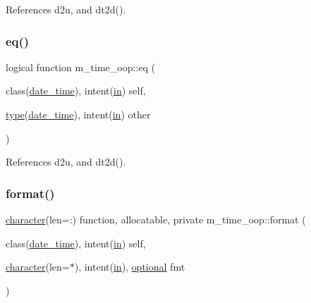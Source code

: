 References d2u, and dt2d().

\mbox{\label{namespacem__time__oop_afcc34853af3eda020eb5ff802e04964d}} 
\subsubsection{\texorpdfstring{eq()}{eq()}}
{\footnotesize\ttfamily logical function m\+\_\+time\+\_\+oop\+::eq (\begin{DoxyParamCaption}\item[{class(\hyperlink{structm__time__oop_1_1date__time}{date\+\_\+time}), intent(\hyperlink{M__journal_83_8txt_afce72651d1eed785a2132bee863b2f38}{in})}]{self,  }\item[{\hyperlink{stop__watch_83_8txt_a70f0ead91c32e25323c03265aa302c1c}{type}(\hyperlink{structm__time__oop_1_1date__time}{date\+\_\+time}), intent(\hyperlink{M__journal_83_8txt_afce72651d1eed785a2132bee863b2f38}{in})}]{other }\end{DoxyParamCaption})\hspace{0.3cm}{\ttfamily [private]}}



References d2u, and dt2d().

\mbox{\label{namespacem__time__oop_a78bb598e3481faa48df9733a3f9ae060}} 
\subsubsection{\texorpdfstring{format()}{format()}}
{\footnotesize\ttfamily \hyperlink{option__stopwatch_83_8txt_abd4b21fbbd175834027b5224bfe97e66}{character}(len=\+:) function, allocatable, private m\+\_\+time\+\_\+oop\+::format (\begin{DoxyParamCaption}\item[{class(\hyperlink{structm__time__oop_1_1date__time}{date\+\_\+time}), intent(\hyperlink{M__journal_83_8txt_afce72651d1eed785a2132bee863b2f38}{in})}]{self,  }\item[{\hyperlink{option__stopwatch_83_8txt_abd4b21fbbd175834027b5224bfe97e66}{character}(len=$\ast$), intent(\hyperlink{M__journal_83_8txt_afce72651d1eed785a2132bee863b2f38}{in}), \hyperlink{option__stopwatch_83_8txt_aa4ece75e7acf58a4843f70fe18c3ade5}{optional}}]{fmt }\end{DoxyParamCaption})\hspace{0.3cm}{\ttfamily [private]}}



